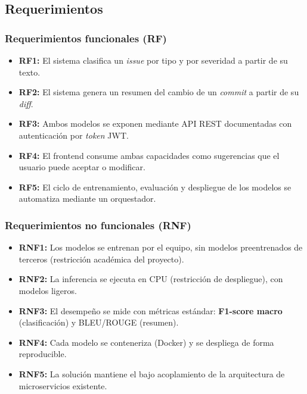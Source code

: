\subsection{Requerimientos}

\subsubsection{Requerimientos funcionales (RF)}
\begin{itemize}\itemsep=1pt
    \item \textbf{RF1:} El sistema clasifica un \textit{issue} por tipo y por severidad a partir de su texto.
    \item \textbf{RF2:} El sistema genera un resumen del cambio de un \textit{commit} a partir de su \textit{diff}.
    \item \textbf{RF3:} Ambos modelos se exponen mediante \acrshort{API} \acrshort{REST} documentadas con autenticación por \textit{token} JWT.
    \item \textbf{RF4:} El frontend consume ambas capacidades como sugerencias que el usuario puede aceptar o modificar.
    \item \textbf{RF5:} El ciclo de entrenamiento, evaluación y despliegue de los modelos se automatiza mediante un orquestador.
\end{itemize}

\subsubsection{Requerimientos no funcionales (RNF)}
\begin{itemize}\itemsep=1pt
    \item \textbf{RNF1:} Los modelos se entrenan por el equipo, sin modelos preentrenados de terceros (restricción académica del proyecto).
    \item \textbf{RNF2:} La inferencia se ejecuta en \acrshort{CPU} (restricción de despliegue), con modelos ligeros.
    \item \textbf{RNF3:} El desempeño se mide con métricas estándar: \textbf{F1-score macro} (clasificación) y \acrshort{BLEU}/\acrshort{ROUGE} (resumen).
    \item \textbf{RNF4:} Cada modelo se conteneriza (Docker) y se despliega de forma reproducible.
    \item \textbf{RNF5:} La solución mantiene el bajo acoplamiento de la arquitectura de microservicios existente.
\end{itemize}

